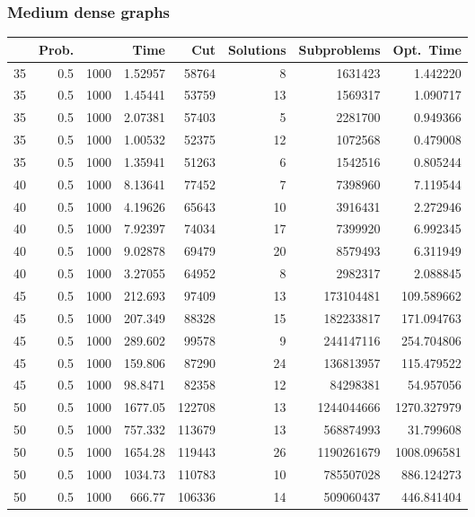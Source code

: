 \documentclass[a4paper,11pt]{article}
\begin{document}
\subsubsection{Medium dense graphs}

\begin{table}
\begin{center}
\begin{tabular}{|rrr|r|r|rr|r|}
\hline
 & Prob. &  & Time & Cut & Solutions & Subproblems & Opt.\ Time \\
\hline
35 & 0.5 & 1000 & 1.52957 & 58764 & 8 & 1631423 & 1.442220 \\
35 & 0.5 & 1000 & 1.45441 & 53759 & 13 & 1569317 & 1.090717 \\
35 & 0.5 & 1000 & 2.07381 & 57403 & 5 & 2281700 & 0.949366 \\
35 & 0.5 & 1000 & 1.00532 & 52375 & 12 & 1072568 & 0.479008 \\
35 & 0.5 & 1000 & 1.35941 & 51263 & 6 & 1542516 & 0.805244 \\
40 & 0.5 & 1000 & 8.13641 & 77452 & 7 & 7398960 & 7.119544 \\
40 & 0.5 & 1000 & 4.19626 & 65643 & 10 & 3916431 & 2.272946 \\
40 & 0.5 & 1000 & 7.92397 & 74034 & 17 & 7399920 & 6.992345 \\
40 & 0.5 & 1000 & 9.02878 & 69479 & 20 & 8579493 & 6.311949 \\
40 & 0.5 & 1000 & 3.27055 & 64952 & 8 & 2982317 & 2.088845 \\
45 & 0.5 & 1000 & 212.693 & 97409 & 13 & 173104481 & 109.589662 \\
45 & 0.5 & 1000 & 207.349 & 88328 & 15 & 182233817 & 171.094763 \\
45 & 0.5 & 1000 & 289.602 & 99578 & 9 & 244147116 & 254.704806 \\
45 & 0.5 & 1000 & 159.806 & 87290 & 24 & 136813957 & 115.479522 \\
45 & 0.5 & 1000 & 98.8471 & 82358 & 12 & 84298381 & 54.957056 \\
50 & 0.5 & 1000 & 1677.05 & 122708 & 13 & 1244044666 & 1270.327979 \\
50 & 0.5 & 1000 & 757.332 & 113679 & 13 & 568874993 & 31.799608 \\
50 & 0.5 & 1000 & 1654.28 & 119443 & 26 & 1190261679 & 1008.096581 \\
50 & 0.5 & 1000 & 1034.73 & 110783 & 10 & 785507028 & 886.124273 \\
50 & 0.5 & 1000 & 666.77 & 106336 & 14 & 509060437 & 446.841404 \\

\end{tabular}
\end{center}
\end{table}
\end{document}
